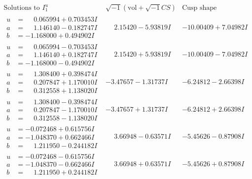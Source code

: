 \documentclass[1p]{elsarticle_modified}
\theoremstyle{definition}
\newcommand{\I}{\sqrt{-1}}
\begin{document}
$$\begin{array}{c|c|c}  
\text{Solutions to }I^u_{1}& \I (\text{vol} + \sqrt{-1}CS) & \text{Cusp shape}\\
 \hline 
\begin{aligned}
u &= \phantom{-}0.065994 + 0.703453 I \\
a &= \phantom{-}1.146140 - 0.182747 I \\
b &= -1.168000 + 0.494902 I\end{aligned}
 & \phantom{-}2.15420 - 5.93819 I & -10.00409 + 7.04982 I \\ \hline\begin{aligned}
u &= \phantom{-}0.065994 - 0.703453 I \\
a &= \phantom{-}1.146140 + 0.182747 I \\
b &= -1.168000 - 0.494902 I\end{aligned}
 & \phantom{-}2.15420 + 5.93819 I & -10.00409 - 7.04982 I \\ \hline\begin{aligned}
u &= \phantom{-}1.308400 + 0.398474 I \\
a &= \phantom{-}0.207847 + 1.170010 I \\
b &= \phantom{-}0.312558 + 1.138020 I\end{aligned}
 & -3.47657 - 1.31737 I & -6.24812 - 2.66398 I \\ \hline\begin{aligned}
u &= \phantom{-}1.308400 - 0.398474 I \\
a &= \phantom{-}0.207847 - 1.170010 I \\
b &= \phantom{-}0.312558 - 1.138020 I\end{aligned}
 & -3.47657 + 1.31737 I & -6.24812 + 2.66398 I \\ \hline\begin{aligned}
u &= -0.072468 + 0.615756 I \\
a &= -1.048370 + 0.662466 I \\
b &= \phantom{-}1.211950 - 0.244182 I\end{aligned}
 & \phantom{-}3.66948 - 0.63571 I & -5.45626 - 0.87908 I \\ \hline\begin{aligned}
u &= -0.072468 - 0.615756 I \\
a &= -1.048370 - 0.662466 I \\
b &= \phantom{-}1.211950 + 0.244182 I\end{aligned}
 & \phantom{-}3.66948 + 0.63571 I & -5.45626 + 0.87908 I \\ \hline\begin{aligned}

\end{aligned}
\end{array}$$
\end{document}
